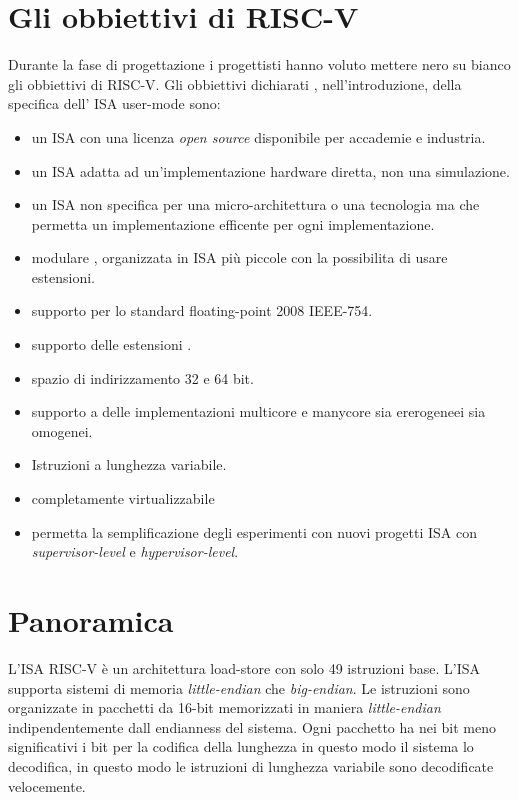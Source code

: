 \documentclass[12pt,a4paper]{report}
\begin{document}


\section{Gli obbiettivi di RISC-V}
Durante la fase di progettazione i progettisti hanno voluto mettere nero su bianco gli obbiettivi di RISC-V. Gli obbiettivi dichiarati , nell'introduzione, della specifica dell' ISA user-mode sono:
\begin{itemize}
	\item un ISA con una licenza \textit{open source} disponibile per accademie e industria.
	\item un ISA adatta ad un’implementazione hardware diretta, non una simulazione.
	\item un ISA non specifica per una micro-architettura o una tecnologia ma che permetta un implementazione efficente per ogni implementazione.
	\item modulare , organizzata in ISA più piccole con la possibilita di usare estensioni.
	\item supporto per lo standard floating-point 2008 IEEE-754.
	\item supporto delle estensioni .
	\item spazio di indirizzamento 32 e 64 bit.
	\item supporto a delle implementazioni multicore e manycore sia ererogeneei sia omogenei.
	\item Istruzioni a lunghezza variabile.
	\item completamente virtualizzabile 
	\item permetta la semplificazione degli esperimenti con nuovi progetti ISA con \textit{supervisor-level} e \textit{hypervisor-level}. 
	
\end{itemize}

\section{Panoramica}
L'ISA RISC-V è un architettura load-store con solo 49 istruzioni base. L'ISA supporta sistemi di memoria \textit{little-endian} che \textit{big-endian}. Le istruzioni sono organizzate in pacchetti da 16-bit memorizzati in maniera \textit{little-endian} indipendentemente dall endianness del sistema.  Ogni pacchetto ha nei bit meno significativi i bit per la codifica della lunghezza in questo modo il sistema lo decodifica, in questo modo le istruzioni di lunghezza variabile sono decodificate velocemente.
\end{document}

